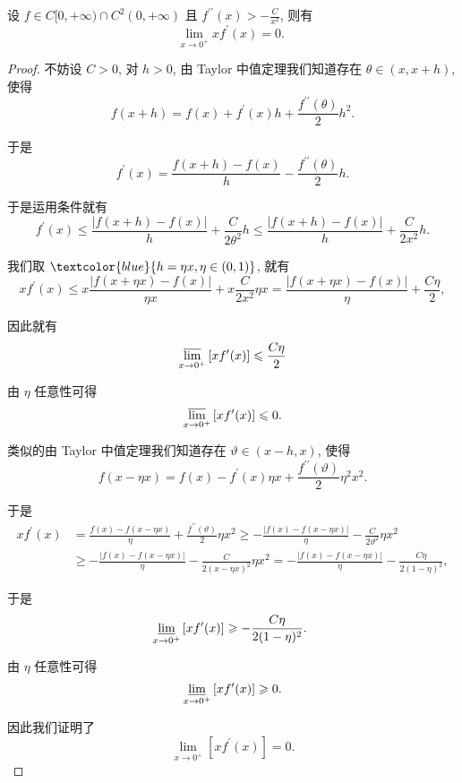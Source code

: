 \begin{exercise}[反向洛必达]
设 $f \in C[0,+\infty) \cap C^2(0,+\infty)$ 且 $f^{\prime \prime}(x)>-\frac{C}{x^2}$, 则有
$$
    \lim _{x \rightarrow 0^{+}} x f^{\prime}(x)=0 \text {. }
$$
\end{exercise}

\begin{proof}
    不妨设 $C>0$, 对 $h>0$, 由 Taylor 中值定理我们知道存在 $\theta \in(x, x+h)$, 使得
    $$
        f(x+h)=f(x)+f^{\prime}(x) h+\frac{f^{\prime \prime}(\theta)}{2} h^2 .
    $$

    于是
    $$
        f^{\prime}(x)=\frac{f(x+h)-f(x)}{h}-\frac{f^{\prime \prime}(\theta)}{2} h .
    $$

    于是运用条件就有
    $$
        f^{\prime}(x) \leqslant \frac{|f(x+h)-f(x)|}{h}+\frac{C}{2 \theta^2} h \leqslant \frac{|f(x+h)-f(x)|}{h}+\frac{C}{2 x^2} h .
    $$

    我们取 $\textcolor{blue}{h=\eta x, \eta \in(0,1)}$, 就有
    $$
        x f^{\prime}(x) \leqslant x \frac{|f(x+\eta x)-f(x)|}{\eta x}+x \frac{C}{2 x^2} \eta x=\frac{|f(x+\eta x)-f(x)|}{\eta}+\frac{C \eta}{2},
    $$

    因此就有
    $$
        \varlimsup_{x \rightarrow 0^{+}}\left[x f^{\prime}(x)\right] \leqslant \frac{C \eta}{2}
    $$

    由 $\eta$ 任意性可得
    $$
        \varlimsup_{x \rightarrow 0^{+}}\left[x f^{\prime}(x)\right] \leqslant 0 .
    $$

    类似的由 Taylor 中值定理我们知道存在 $\vartheta \in(x-h, x)$, 使得
    $$
        f(x-\eta x)=f(x)-f^{\prime}(x) \eta x+\frac{f^{\prime \prime}(\vartheta)}{2} \eta^2 x^2 .
    $$

    于是
    $$
        \begin{aligned}
            x f^{\prime}(x) & =\frac{f(x)-f(x-\eta x)}{\eta}+\frac{f^{\prime \prime}(\vartheta)}{2} \eta x^2 \geqslant-\frac{|f(x)-f(x-\eta x)|}{\eta}-\frac{C}{2 \vartheta^2} \eta x^2 \\
                            & \geqslant-\frac{|f(x)-f(x-\eta x)|}{\eta}-\frac{C}{2(x-\eta x)^2} \eta x^2=-\frac{|f(x)-f(x-\eta x)|}{\eta}-\frac{C \eta}{2(1-\eta)^2},
        \end{aligned}
    $$

    于是
    $$
        \varliminf_{x \rightarrow 0^{+}}\left[x f^{\prime}(x)\right] \geqslant-\frac{C \eta}{2(1-\eta)^2} \text {. }
    $$

    由 $\eta$ 任意性可得
    $$
        \varliminf_{x \rightarrow 0^{+}}\left[x f^{\prime}(x)\right] \geqslant 0 .
    $$

    因此我们证明了
    $$
        \lim _{x \rightarrow 0^{+}}\left[x f^{\prime}(x)\right]=0 .
    $$
\end{proof}

